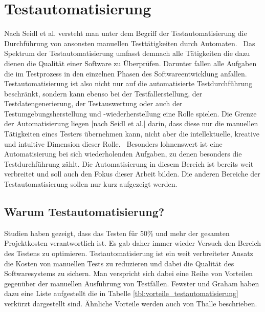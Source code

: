 \chapter{Testautomatisierung}
\label{sec:testautomatisierung}

Nach Seidl et al. versteht man unter dem Begriff der Testautomatisierung \glqq die Durchführung von ansonsten manuellen Testtätigkeiten durch Automaten.\grqq\ \cite[Seite 7]{seidl_basiswissen_2012}
Das Spektrum der Testautomatisierung umfasst demnach alle Tätigkeiten die dazu dienen die Qualität einer Software zu Überprüfen. Darunter fallen alle Aufgaben die im Testprozess in den einzelnen Phasen des Softwareentwicklung anfallen.
Testautomatisierung ist also nicht nur auf die automatisierte Testdurchführung beschränkt, sondern kann ebenso bei der Testfallerstellung, der Testdatengenerierung, der Testauswertung oder auch der Testumgebungsherstellung und -wiederherstellung eine Rolle spielen.
\glqq Die Grenze der Automatisierung liegen [nach Seidl et al.] darin, dass diese nur die manuellen Tätigkeiten eines Testers übernehmen kann, nicht aber die intellektuelle, kreative und intuitive Dimension dieser Rolle.\grqq\ \cite[Seite 7]{seidl_basiswissen_2012}
Besonders lohnenswert ist eine Automatisierung bei sich wiederholenden Aufgaben, zu denen
besonders die Testdurchführung zählt. Die Automatisierung in diesem Bereich ist bereits weit verbreitet und soll auch den Fokus dieser Arbeit bilden. Die anderen Bereiche der Testautomatisierung sollen nur kurz aufgezeigt werden.

\section{Warum Testautomatisierung?}
\label{sec:warum_testautomatisierung}

Studien haben gezeigt, dass das Testen für 50\% und mehr der gesamten Projektkosten verantwortlich ist. \cite{ramler_economic_2006} 
Es gab daher immer wieder Versuch den Bereich des Testens zu optimieren. Testautomatisierung ist ein weit verbreiteter Ansatz die Kosten von manuellen Tests zu reduzieren und dabei die Qualität des Softwaresystems zu sichern. \cite{amannejad_search-based_2014} Man verspricht sich dabei eine Reihe von Vorteilen gegenüber der manuellen Ausführung von Testfällen. Fewster und Graham haben dazu eine Liste aufgestellt die in Tabelle \ref{tbl:vorteile_testautomatisierung} verkürzt dargestellt sind.
Ähnliche Vorteile werden auch von Thalle \cite[Seite 228]{thaller_software-test_2002} beschrieben.


